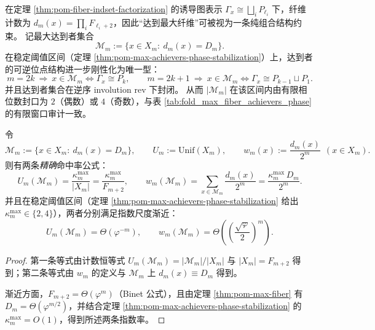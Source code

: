 \begin{remark}\label{rem:pom-max-achievers-graph-structure}
在定理 \ref{thm:pom-fiber-indset-factorization} 的诱导图表示 \(\Gamma_x\cong\bigsqcup_i P_{\ell_i}\) 下，纤维计数为 \(d_m(x)=\prod_i F_{\ell_i+2}\)，因此“达到最大纤维”可被视为一条纯组合结构约束。
记最大达到者集合
\[
\mathcal{M}_m:=\{x\in X_m:\ d_m(x)=D_m\}.
\]
在稳定阈值区间（定理 \ref{thm:pom-max-achievers-phase-stabilization}）上，达到者的可逆位点结构进一步刚性化为唯一型：
\[
m=2k\ \Rightarrow\ x\in\mathcal{M}_m\iff \Gamma_x\cong P_k,
\qquad
m=2k+1\ \Rightarrow\ x\in\mathcal{M}_m\iff \Gamma_x\cong P_{k-1}\sqcup P_1.
\]
并且达到者集合在逆序 involution \(\mathrm{rev}\) 下封闭。
从而 \(|\mathcal{M}_m|\) 在该区间内由有限相位数封口为 \(2\)（偶数）或 \(4\)（奇数），与表 \ref{tab:fold_max_fiber_achievers_phase} 的有限窗口审计一致。
\end{remark}

\begin{corollary}[最大纤维达到者在两种自然测度下的指数稀薄率]\label{cor:pom-maxfiber-rarity-two-measures}
令
\[
\mathcal{M}_m:=\{x\in X_m:\ d_m(x)=D_m\},
\qquad
U_m:=\mathrm{Unif}(X_m),
\qquad
w_m(x):=\frac{d_m(x)}{2^m}\ \ (x\in X_m).
\]
则有两条\emph{精确}命中率公式：
\[
U_m(\mathcal{M}_m)=\frac{\kappa_m^{\mathrm{max}}}{|X_m|}
=\frac{\kappa_m^{\mathrm{max}}}{F_{m+2}},
\qquad
w_m(\mathcal{M}_m)=\sum_{x\in\mathcal{M}_m}\frac{d_m(x)}{2^m}
=\frac{\kappa_m^{\mathrm{max}}\,D_m}{2^m}.
\]
并且在稳定阈值区间（定理 \ref{thm:pom-max-achievers-phase-stabilization} 给出 \(\kappa_m^{\mathrm{max}}\in\{2,4\}\)），两者分别满足指数尺度渐近：
\[
U_m(\mathcal{M}_m)=\Theta(\varphi^{-m}),
\qquad
w_m(\mathcal{M}_m)=\Theta\!\left(\left(\frac{\sqrt{\varphi}}{2}\right)^m\right).
\]
\end{corollary}
\begin{proof}
第一条等式由计数恒等式 \(U_m(\mathcal{M}_m)=|\mathcal{M}_m|/|X_m|\) 与 \(|X_m|=F_{m+2}\) 得到；第二条等式由 \(w_m\) 的定义与 \(\mathcal{M}_m\) 上 \(d_m(x)\equiv D_m\) 得到。
\par
渐近方面，\(F_{m+2}=\Theta(\varphi^m)\)（Binet 公式），且由定理 \ref{thm:pom-max-fiber} 有 \(D_m=\Theta(\varphi^{m/2})\)，并结合定理 \ref{thm:pom-max-achievers-phase-stabilization} 的 \(\kappa_m^{\mathrm{max}}=O(1)\)，得到所述两条指数率。
\end{proof}

